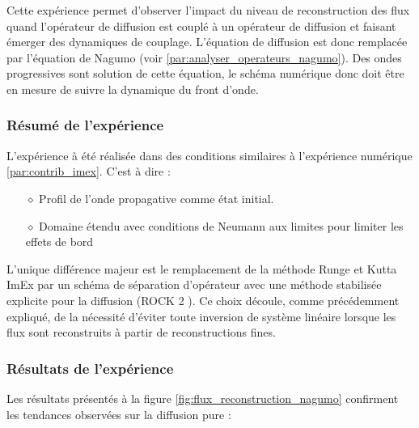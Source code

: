 Cette expérience permet d'observer l'impact du niveau de reconstruction des flux quand l'opérateur de diffusion est couplé à un opérateur de diffusion et faisant émerger des dynamiques de couplage.
L'équation de diffusion est donc remplacée par l'équation de Nagumo (voir \ref{par:analyser_operateurs_nagumo}).
Des ondes progressives sont solution de cette équation, le schéma numérique donc doit être en mesure de suivre la dynamique du front d'onde.

\subsubsection{Résumé de l'expérience}
L'expérience à été réalisée dans des conditions similaires à l'expérience numérique \ref{par:contrib_imex}. 
C'est à dire :
\begin{itemize}
    \item[$\diamond$] Profil de l'onde propagative comme état initial.
    \item[$\diamond$] Domaine étendu avec conditions de Neumann aux limites pour limiter les effets de bord
\end{itemize}
L'unique différence majeur est le remplacement de la méthode Runge et Kutta ImEx par un schéma de séparation d'opérateur avec une méthode stabilisée explicite pour la diffusion (ROCK 2 \cite{AbdulleMedovikov2001}).
Ce choix découle, comme précédemment expliqué, de la nécessité d'éviter toute inversion de système linéaire lorsque les flux sont reconstruits à partir de reconstructions
fines.
\subsubsection{Résultats de l'expérience}
Les résultats présentés à la figure \ref{fig:flux_reconstruction_nagumo} confirment les tendances observées sur la diffusion pure :

